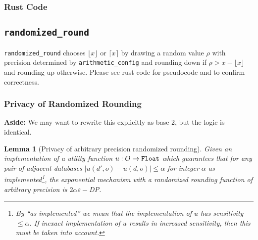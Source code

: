 \documentclass[11pt]{article}
\newtheorem{lemma}[theorem]{Lemma}
\theoremstyle{definition}
\newcommand{\Float}{{\tt Float}}
\newcommand{\aside}[1]{{\color{teal} \textbf{Aside:} #1}}
\begin{document}
 
\subsubsection{Rust Code}



\subsection{\texttt{randomized\_round}}\label{section:randomizedround}
\texttt{randomized\_round} chooses $\lfloor{x}\rfloor$ or $\lceil{x}\rceil$ by drawing a random value $\rho$ with precision determined by {\tt arithmetic\_config} and rounding down if $\rho >  x - \lfloor{x}\rfloor$ and rounding up otherwise. Please see rust code for pseudocode and to confirm correctness.

\subsubsection{Privacy of Randomized Rounding}
\aside{We may want to rewrite this explicitly as base 2, but the logic is identical.}
\begin{lemma}[Privacy of arbitrary precision randomized
rounding]\label{lemma:randomizedrounding}
Given an implementation of a utility function $u: O \rightarrow \Float$ which guarantees that for any pair of adjacent databases $|u(d',o)- u(d,o)| \leq \alpha$ for integer $\alpha$ as implemented\footnote{By ``as implemented'' we mean that the implementation of $u$ has sensitivity $\leq \alpha$. If inexact implementation of $u$ results in increased sensitivity, then this must be taken into account.}, the exponential mechanism with a randomized rounding function of arbitrary precision is $2\alpha \varepsilon-$DP.
\end{lemma}
\end{document}
